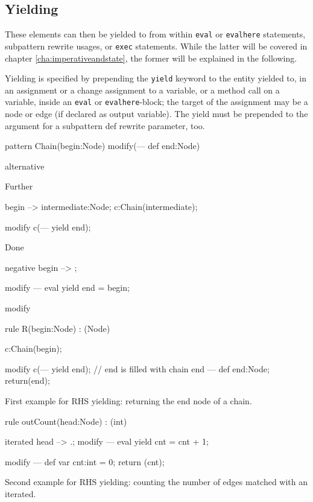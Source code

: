 \subsection{Yielding}\label{sub:yield} 

These elements can then be yielded to from within \texttt{eval} or \texttt{evalhere} statements, subpattern rewrite usages, or \texttt{exec} statements.
While the latter will be covered in chapter \ref{cha:imperativeandstate}, the former will be explained in the following.

Yielding is specified by prepending the \texttt{yield} keyword to the entity yielded to,
in an assignment or a change assignment to a variable, or a method call on a variable,
inside an \texttt{eval} or \texttt{evalhere}-block; 
the target of the assignment may be a node or edge (if declared as output variable).
The yield must be prepended to the argument for a subpattern def rewrite parameter, too.

\begin{example}
  \begin{grgen}
pattern Chain(begin:Node) modify(--- def end:Node)
{
  alternative {
    Further {
      begin --> intermediate:Node;
      c:Chain(intermediate);
      
      modify {
        c(--- yield end);
      }
    }
    Done {
      negative {
        begin --> ;
      }
      
      modify {
      ---
        eval {
          yield end = begin;
        }
      }
    }
  }
  
  modify { }
}

rule R(begin:Node) : (Node) {
  c:Chain(begin);

  modify {
    c(--- yield end); // end is filled with chain end
  ---
    def end:Node;
    return(end);
  }
}
  \end{grgen}
  First example for RHS yielding: returning the end node of a chain.
\end{example}

\begin{example}
  \begin{grgen}
rule outCount(head:Node) : (int)
{
  iterated {
    head --> .;
    modify {
    ---
      eval { yield cnt = cnt + 1; }
    }
  }

  modify {
  ---
    def var cnt:int = 0;
    return (cnt);
  }
}
  \end{grgen}
  Second example for RHS yielding: counting the number of edges matched with an iterated.
\end{example}

